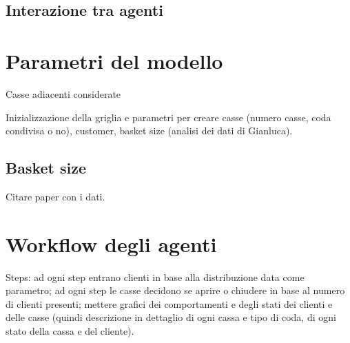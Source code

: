 \subsection{Interazione tra agenti}

\section{Parametri del modello}
\label{model:parameters}

Casse adiacenti considerate

Inizializzazione della griglia e parametri per creare casse (numero casse, coda condivisa o no), customer, basket size (analisi dei dati di Gianluca).

\subsection{Basket size}
Citare paper con i dati.

\section{Workflow degli agenti}


Steps: ad ogni step entrano clienti in base alla distribuzione data come parametro; ad ogni step le casse decidono se aprire o chiudere in base al numero di clienti presenti; mettere grafici dei comportamenti e degli stati dei clienti e delle casse (quindi descrizione in dettaglio di ogni cassa e tipo di coda, di ogni stato della cassa e del cliente).